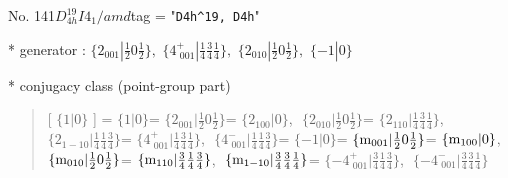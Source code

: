 \documentclass[fleqn,10pt,landscape]{jsarticle}
\begin{document}
\newpage

No. 141\quad$D_{4h}^{19}$\quad$I4_1/amd$\quad[ tetragonal ]
tag = "{\tt D4h^19, D4h}"

* generator : $\{2{}_{001}|\frac{1}{2} 0 \frac{1}{2}\},\,\,\{4^{+}_{\,\,001}|\frac{1}{4} \frac{3}{4} \frac{1}{4}\},\,\,\{2{}_{010}|\frac{1}{2} 0 \frac{1}{2}\},\,\,\{-1|0\}$

* conjugacy class (point-group part)
\begin{quote}
[ $\{1|0\}$ ] = \quad $\{1|0\}$ = \quad $\{2{}_{001}|\frac{1}{2} 0 \frac{1}{2}\}$\newline[ $\{2{}_{100}|0\}$ ] = \quad $\{2{}_{100}|0\}$,\,\, $\{2{}_{010}|\frac{1}{2} 0 \frac{1}{2}\}$ = \quad $\{2{}_{110}|\frac{1}{4} \frac{3}{4} \frac{1}{4}\}$,\,\, $\{2{}_{1-10}|\frac{1}{4} \frac{1}{4} \frac{3}{4}\}$ = \quad $\{4^{+}_{\,\,001}|\frac{1}{4} \frac{3}{4} \frac{1}{4}\}$,\,\, $\{4^{-}_{\,\,001}|\frac{1}{4} \frac{1}{4} \frac{3}{4}\}$\newline[ $\{-1|0\}$ ] = \quad $\{-1|0\}$ = \quad $\{{\rm m}_{001}|\frac{1}{2} 0 \frac{1}{2}\}$\newline[ $\{{\rm m}_{100}|0\}$ ] = \quad $\{{\rm m}_{100}|0\}$,\,\, $\{{\rm m}_{010}|\frac{1}{2} 0 \frac{1}{2}\}$ = \quad $\{{\rm m}_{110}|\frac{3}{4} \frac{1}{4} \frac{3}{4}\}$,\,\, $\{{\rm m}_{1-10}|\frac{3}{4} \frac{3}{4} \frac{1}{4}\}$ = \quad $\{-4^{+}_{\,\,001}|\frac{3}{4} \frac{1}{4} \frac{3}{4}\}$,\,\, $\{-4^{-}_{\,\,001}|\frac{3}{4} \frac{3}{4} \frac{1}{4}\}$\newline
\end{quote}
\end{document}
